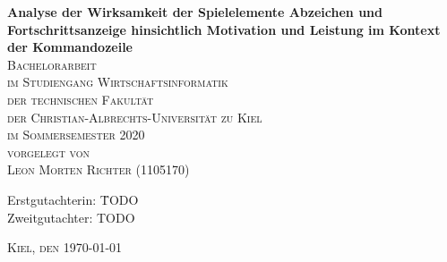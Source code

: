 \begin{titlepage}
\begin{center}


{ \Large \bfseries
Analyse der Wirksamkeit der Spielelemente Abzeichen und Fortschrittsanzeige hinsichtlich Motivation und Leistung im Kontext der Kommandozeile
}\\[2.5cm]

\textsc{ Bachelorarbeit}\\[2.0cm]

\textsc{ 
im Studiengang Wirtschaftsinformatik \\
der technischen Fakultät \\
der Christian-Albrechts-Universität zu Kiel \\
im Sommersemester 2020 
}\\[2.5cm]

\textsc{ 
vorgelegt von \\
Leon Morten Richter (1105170)
}\\[2.5cm]

\vfill

\begin{flushleft}
    \begin{tabbing}
        Erstgutachterin: \=  TODO \\
        Zweitgutachter: \> TODO \\[1.25cm]
    \end{tabbing}
\textsc{Kiel, den \today}
\end{flushleft}

\end{center}
\end{titlepage}
